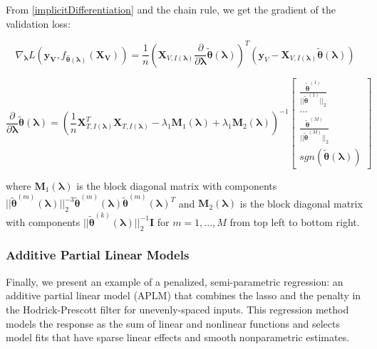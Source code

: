\documentclass[10pt,letterpaper]{article}
\begin{document}
From \eqref{implicitDifferentiation} and the chain rule, we get the gradient of the validation loss:

\begin{equation}
\nabla_{\boldsymbol \lambda} L(\boldsymbol{y_V}, f_{\hat{\boldsymbol{\theta}}(\boldsymbol{\lambda})}(\boldsymbol{X_V})) =
\frac{1}{n}
\left (
\boldsymbol{X}_{V, I(\boldsymbol\lambda)}
\frac{\partial}{\partial \boldsymbol\lambda} \tilde{\boldsymbol{\theta}}(\boldsymbol{\lambda})
\right )^T
\left (
\boldsymbol{y}_V - \boldsymbol{X}_{V, I(\boldsymbol\lambda)} \tilde{\boldsymbol{\theta}}(\boldsymbol{\lambda})
\right )
\end{equation}

\begin{equation}
\frac{\partial}{\partial \boldsymbol\lambda} \tilde{\boldsymbol{\theta}}(\boldsymbol{\lambda}) =
\left (
\frac{1}{n} \boldsymbol{X}_{T, I(\boldsymbol\lambda)}^T \boldsymbol{X}_{T, I(\boldsymbol\lambda)} - \lambda_1 \boldsymbol{M}_1(\boldsymbol\lambda) + \lambda_1 \boldsymbol{M}_2(\boldsymbol\lambda)
\right ) ^{-1}
\begin{bmatrix}
\frac{\tilde{\boldsymbol{\theta}}^{(1)}}{||\tilde{\boldsymbol{\theta}}^{(1)}||_2}\\
...\\
\frac{\tilde{\boldsymbol\theta}^{(M)}}{||\tilde{\boldsymbol{\theta}}^{(M)}||_2}\\
sgn(\tilde{\boldsymbol{\theta}}(\boldsymbol{\lambda}))
\end{bmatrix}
\end{equation}

where $\boldsymbol{M}_1(\boldsymbol\lambda)$ is the block diagonal matrix with  components 
$
|| \tilde{\boldsymbol{\theta}}^{(m)}(\boldsymbol{\lambda})||_2^{-3} \tilde{\boldsymbol{\theta}}^{(m)}(\boldsymbol{\lambda}) \tilde{\boldsymbol{\theta}}^{(m)}(\boldsymbol{\lambda})^T
$ and $\boldsymbol{M}_2(\boldsymbol\lambda)$ is the block diagonal matrix with components
$||\tilde{\boldsymbol{\theta}}^{(k)}(\boldsymbol{\lambda})||_2^{-1} \boldsymbol{I}$
for $m = 1, ..., M$ 
from top left to bottom right.

\subsubsection{Additive Partial Linear Models}

Finally, we present an example of a penalized, semi-parametric regression: an additive partial linear model (APLM) that combines the lasso and the penalty in the Hodrick-Prescott filter for unevenly-spaced inputs. This regression method models the response as the sum of linear and nonlinear functions and selects model fits that have sparse linear effects and smooth nonparametric estimates.
\end{document}
